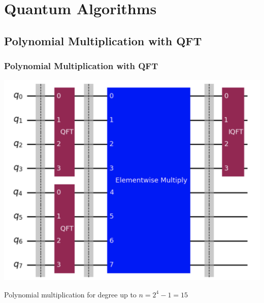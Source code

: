 \documentclass[
	11pt, %
]{beamer}
\begin{document}



\section{Quantum Algorithms}
\subsection{Polynomial Multiplication with QFT}
\begin{frame}
    \frametitle{Polynomial Multiplication with QFT}
    \begin{center}
        \includegraphics[scale=0.28]{unitary.png}
    \end{center}
    Polynomial multiplication for degree up to $n=2^4 - 1 = 15$
\end{frame}
\end{document}
